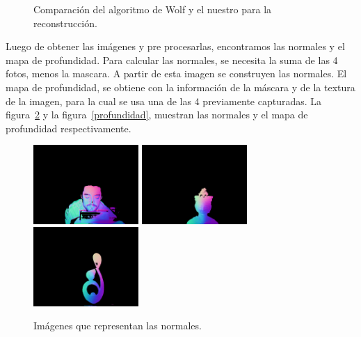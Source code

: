 \documentclass[twocolumn,11pts]{IEEEtran}
\begin{document}
\begin{figure}[bt]%
\centering
{}%
\caption{Comparación del algoritmo de Wolf y el nuestro para la reconstrucción.}
\label{comparacion}
\end{figure}

Luego de obtener las imágenes y pre procesarlas, encontramos las normales y el mapa de profundidad. Para calcular las normales, se necesita la suma de las 4 fotos, menos la mascara. A partir de esta imagen se construyen las normales. El mapa de profundidad, se obtiene con la información de la máscara y de la textura de la imagen, para la cual se usa una de las 4 previamente capturadas. La figura~\ref{normal} y la figura~\ref{profundidad}, muestran las normales y el mapa de profundidad respectivamente.

\begin{figure}[t]
\begin{center}
	\includegraphics[width= 4cm]{Normalcrepu}
	\includegraphics[width= 4cm]{Normalmona}
	\includegraphics[width= 4cm]{Normalniple}
		\caption{Imágenes que representan las normales.}
		\label{normal}
\end{center}
\end{figure}
\end{document}
